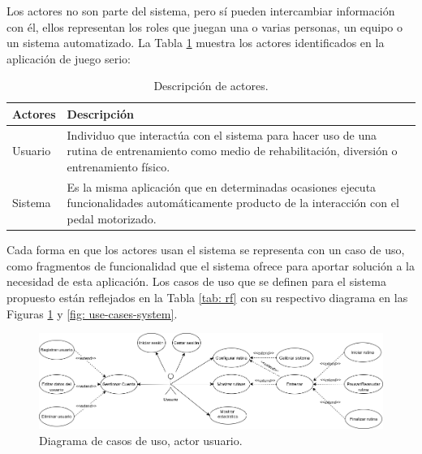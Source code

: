 Los actores no son parte del sistema, pero sí pueden intercambiar información con él, ellos representan los roles que juegan una o varias personas, un equipo o un sistema automatizado. La Tabla \ref{tab: actores} muestra los actores identificados en la aplicación de juego serio:

\begin{table}[ht]
    \centering
    \begin{tabularx}{\textwidth}{|l|X|}
        \hline
        \textbf{Actores} & \textbf{Descripción} \\\hline
        Usuario & Individuo que interactúa con el sistema para hacer uso de una rutina de entrenamiento
        como medio de rehabilitación, diversión o entrenamiento físico. \\\hline
        Sistema & Es la misma aplicación que en determinadas ocasiones ejecuta funcionalidades automáticamente producto de la interacción con el pedal motorizado. \\\hline
    \end{tabularx}
    \caption{Descripción de actores.}
    \label{tab: actores}
\end{table}

Cada forma en que los actores usan el sistema se representa con un caso de uso, como fragmentos de funcionalidad que el sistema ofrece para aportar solución a la necesidad de esta aplicación. Los casos de uso que se definen para el sistema propuesto están reflejados en la Tabla \ref{tab: rf} con su respectivo diagrama en las Figuras \ref{fig: use-cases-user} y \ref{fig: use-cases-system}.

\begin{figure}[!ht]
    \centering
    \includegraphics[scale=0.44]{images/diagram-usecase-user.png}
    \caption{Diagrama de casos de uso, actor usuario.}
    \label{fig: use-cases-user}
\end{figure}

